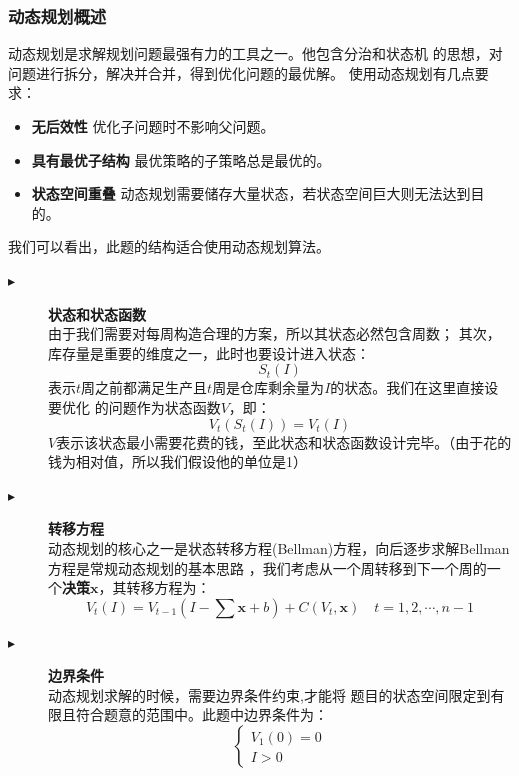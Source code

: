 \documentclass[withoutpreface,bwprint]{cumcmthesis}
\begin{document}
\subsubsection*{动态规划概述}
动态规划是求解规划问题最强有力的工具之一。他包含分治和状态机
的思想，对问题进行拆分，解决并合并，得到优化问题的最优解。
使用动态规划有几点要求：
\begin{itemize}
    \item \textbf{无后效性} \quad 优化子问题时不影响父问题。
    \item \textbf{具有最优子结构} \quad 最优策略的子策略总是最优的。
    \item \textbf{状态空间重叠} \quad 动态规划需要储存大量状态，若状态空间巨大则无法达到目的。
\end{itemize}
我们可以看出，此题的结构适合使用动态规划算法。\par
\begin{description}
    \item[$\blacktriangleright$] \textbf{状态和状态函数} \\
        由于我们需要对每周构造合理的方案，所以其状态必然包含周数；
        其次，库存量是重要的维度之一，此时也要设计进入状态：
        $$
            S_t(I)
        $$
        表示$t$周之前都满足生产且$t$周是仓库剩余量为$I$的状态。我们在这里直接设要优化
        的问题作为状态函数$V$，即：
        $$
            V_t(S_t(I)) = V_t(I)
        $$
        $V$表示该状态最小需要花费的钱，至此状态和状态函数设计完毕。（由于花的钱为相对值，所以我们假设他的单位是1）
    \item[$\blacktriangleright$] \textbf{转移方程} \\
        动态规划的核心之一是状态转移方程(Bellman)方程，向后逐步求解Bellman方程是常规动态规划的基本思路
        ，我们考虑从一个周转移到下一个周的一个\textbf{决策}$\bm{x}$，其转移方程为：
        \begin{equation}
            V_t(I) = V_{t-1}(I - \sum \bm{x} + b) + C(V_t,\bm{x}) \quad t = 1,2,\cdots , n-1
            \label{状态转移方程}
        \end{equation}
    \item[$\blacktriangleright$] \textbf{边界条件} \\
        动态规划求解的时候，需要边界条件约束,才能将
        题目的状态空间限定到有限且符合题意的范围中。此题中边界条件为：
        $$
            \left\{
            \begin{aligned}
                V_1(0) = 0 \\
                I > 0
            \end{aligned}
            \right.
        $$
\end{description}
\end{document}
